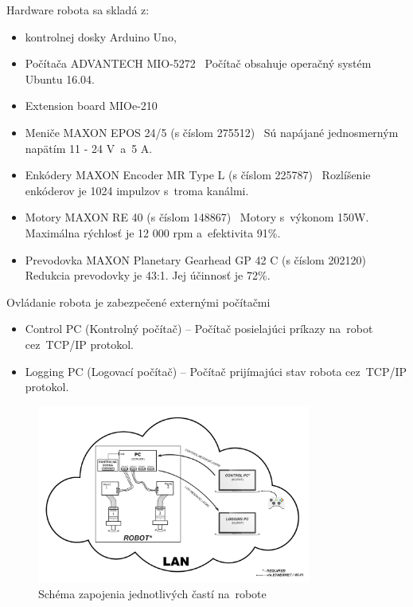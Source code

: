 Hardware robota sa skladá z:
\begin{itemize}
	\item kontrolnej dosky Arduino Uno,

	\item Počítača ADVANTECH MIO-5272~\cite{robotPc} \newline
		Počítač obsahuje operačný systém Ubuntu 16.04.

	\item Extension board MIOe-210~\cite{extensionModule}

	\item Meniče MAXON EPOS 24/5 (s číslom 275512)~\cite{menic} \newline
	 	Sú napájané jednosmerným napätím 11 - 24 V~a~5 A.

	\item Enkódery MAXON Encoder MR Type L (s číslom 225787)~\cite{encoder} \newline
		Rozlíšenie enkóderov je 1024 impulzov s~troma kanálmi.

	\item Motory MAXON RE 40 (s číslom 148867)~\cite{motor} \newline
		Motory s~výkonom 150W. Maximálna rýchlosť je 12 000 rpm a~efektivita 91\%.

	\item Prevodovka MAXON Planetary Gearhead GP 42 C (s číslom 202120)~\cite{prevodovka} \newline
		Redukcia prevodovky je 43:1. Jej účinnosť je 72\%.
\end{itemize}

\noindent Ovládanie robota je zabezpečené externými počítačmi
\begin{itemize}
	\item Control PC (Kontrolný počítač) -- Počítač posielajúci príkazy na~robot cez~TCP/IP protokol.
	\item Logging PC (Logovací počítač) -- Počítač prijímajúci stav robota cez~TCP/IP protokol.
\end{itemize}

\begin{figure}[!htbp]
	\begin{center}
		\includegraphics[width=9cm]{img/schemaRobota.png}
	\end{center}
	\caption{Schéma zapojenia jednotlivých častí na~robote}
	\label{fig:schemaRobota}
\end{figure}

